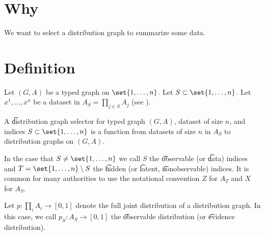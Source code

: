 
\section*{Why}

We want to select a distribution graph to summarize some data.

\section*{Definition}

Let $(G, A)$ be a typed graph on $\set{1, \dots , n}$.
Let $S \subset \set{1, \dots , n}$.
Let $x^1, \dots , x^n$ be a dataset in $A_S = \prod_{j \in S} A_j$ (see ).

A \t{distribution graph selector} for typed graph $(G, A)$, dataset of size $n$, and indices $S \subset\set{1, \dots , n}$ is a function from datasets of size $n$ in $A_S$ to distribution graphs on $(G, A)$.

In the case that $S \neq\set{1, \dots , n}$ we call $S$ the \t{observable} (or \t{data}) indices and $T = \set{1,\dots ,n} \setminus S$ the \t{hidden} (or \t{latent}, \t{nonobservable}) indices.
It is common for many authorities to use the notational convention $Z$ for $A_T$ and $X$ for $A_S$.

Let $p: \prod_{i} A_i \to [0, 1]$ denote the full joint distribution of a distribution graph.
In this case, we call $p_{S}: A_S \to [0, 1]$ the \t{observable distribution} (or \t{evidence distribution}).


\blankpage